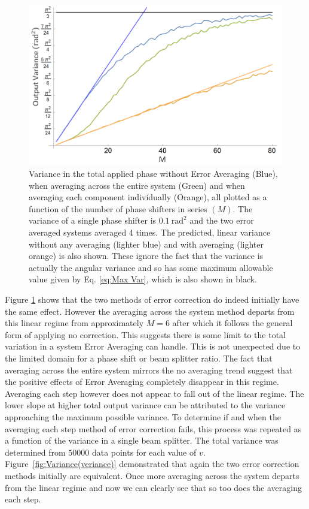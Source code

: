 \documentclass[aps,pra,twocolumn,superscriptaddress,numerical,floatfix]{revtex4-1}
\begin{document}
\begin{figure}
\centerline{\includegraphics[width=\columnwidth]{phase_all.png}}
\caption{Variance in the total applied phase without Error Averaging (Blue), when averaging across the entire system (Green) and when averaging each component individually (Orange), all plotted as a function of the number of phase shifters in series $(M)$. The variance of a single phase shifter is $0.1\ \textrm{rad}^{2}$ and the two error averaged systems averaged 4 times. The predicted, linear variance without any averaging (lighter blue) and with averaging (lighter orange) is also shown. These ignore the fact that the variance is actually the angular variance and so has some maximum allowable value given by Eq. \ref{eq:Max Var}, which is also shown in black. \label{fig:Variance-in-phase all}}
\end{figure}
%
Figure \ref{fig:Variance-in-phase all} shows that the two methods of error correction do indeed initially have the same effect. However the averaging across the system method departs from this linear regime from approximately $M=6$ after which it follows the general form of applying no correction. This suggests there is some limit to the total variation in a system Error Averaging can handle. This is not unexpected due to the limited domain for a phase shift or beam splitter ratio. The fact that averaging across the entire system mirrors the no averaging trend suggest that the positive effects of Error Averaging completely disappear in this regime. Averaging each step however does not appear to fall out of the linear regime. The lower slope at higher total output variance can be attributed to the variance approaching the maximum possible variance.  To determine if and when the averaging each step method of error correction fails, this process was repeated as a function of the variance in a single beam splitter. The total variance was determined from $50000$ data points for each value of $v$. Figure~\ref{fig:Variance(veriance)} demonstrated that again the two error correction methods initially are equivalent. Once more averaging across the system departs from the linear regime and now we can clearly see that so too does the averaging each step.
\end{document}
